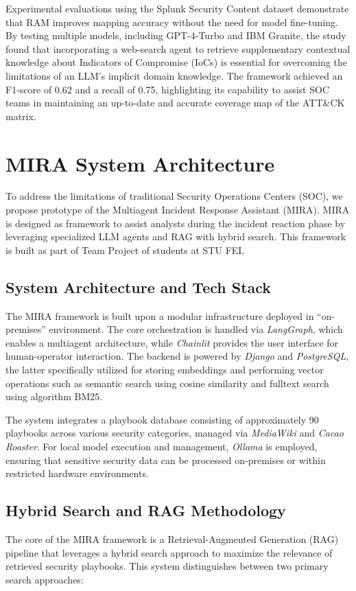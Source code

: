 \documentclass[conference]{IEEEtran}
\begin{document}
Experimental evaluations using the Splunk Security Content dataset demonstrate that RAM improves mapping accuracy without the need for model fine-tuning. 
By testing multiple models, including GPT-4-Turbo and IBM Granite, the study found that incorporating a web-search agent to retrieve supplementary contextual knowledge 
about Indicators of Compromise (IoCs) is essential for overcoming the limitations of an LLM’s implicit domain knowledge. 
The framework achieved an F1-score of 0.62 and a recall of 0.75, highlighting its capability to assist SOC teams in maintaining an up-to-date and accurate coverage 
map of the ATT\&CK matrix.

\section{MIRA System Architecture}\label{sec:mira}

To address the limitations of traditional Security Operations Centers (SOC), we propose prototype of the Multiagent Incident Response Assistant (MIRA). 
MIRA is designed as framework to assist analysts during the incident reaction phase by leveraging specialized LLM agents and RAG with hybrid search.
This framework is built as part of Team Project of students at STU FEI.

\subsection{System Architecture and Tech Stack}
The MIRA framework is built upon a modular infrastructure deployed in ``on-premises'' environment. 
The core orchestration is handled via \textit{LangGraph}, which enables a multiagent architecture, 
while \textit{Chainlit} provides the user interface for human-operator interaction. 
The backend is powered by \textit{Django} and \textit{PostgreSQL}, the latter specifically utilized for storing embeddings and performing vector operations 
such as semantic search using cosine similarity and fulltext search using algorithm BM25. 

The system integrates a playbook database consisting of approximately 90 playbooks across various security categories, managed via \textit{MediaWiki} and \textit{Cacao Roaster}. For local model execution and management, \textit{Ollama} is employed, ensuring that sensitive security data can be processed on-premises or within restricted hardware environments.

\subsection{Hybrid Search and RAG Methodology}
The core of the MIRA framework is a Retrieval-Augmented Generation (RAG) pipeline that leverages a hybrid search approach 
to maximize the relevance of retrieved security playbooks. This system distinguishes between two primary search approaches:
\end{document}
